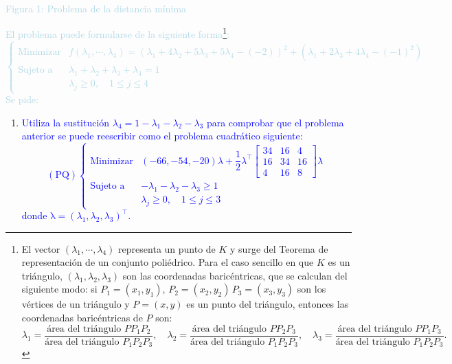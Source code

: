 \documentclass[a4paper]{article}
\newcommand{\lb}[1]{\textcolor{lightblue}{#1}}
\newcommand{\db}[1]{\textcolor{blue}{#1}}
\begin{document}
\begin{enumerate}[label=\color{red}\arabic*.]
\begin{center}
    
    \lb{Figura 1: Problema de la distancia mínima}
    \end{center}
    \lb{El problema puede formularse de la siguiente forma\footnote{El vector $(\lambda_1,\cdots,\lambda_4)$ representa un punto de $K$ y surge del Teorema de representación de un conjunto poliédrico. Para el caso sencillo en que $K$ es un triángulo, $(\lambda_1,\lambda_2,\lambda_3)$ son las coordenadas baricéntricas, que se calculan del siguiente modo: si $P_1=(x_1,y_1),\, P_2=(x_2,y_2)\, P_3=(x_3,y_3)$ son los vértices de un triángulo y $P=(x,y)$ es un punto del triángulo, entonces las coordenadas baricéntricas de $P$ son: \[ \lambda_1=\dfrac{\text{área del triángulo }PP_1P_2}{\text{área del triángulo }P_1P_2P_3},\quad\lambda_2=\dfrac{\text{área del triángulo }PP_2P_3}{\text{área del triángulo } P_1P_2P_3},\quad\lambda_3=\dfrac{\text{área del triángulo }PP_1P_3}{\text{área del triángulo }P_1P_2P_3}. \]}: \[ \begin{cases}
    \text{Minimizar} & f(\lambda_1,\cdots,\lambda_4)=(\lambda_1+4\lambda_2+5\lambda_3+5\lambda_4-(-2))^2+(\lambda_1+2\lambda_3+4\lambda_4-(-1)^2)\\
    \text{Sujeto a} & \lambda_1+\lambda_2+\lambda_3+\lambda_4=1\\
     & \lambda_j\ge0,\quad 1\le j\le 4
    \end{cases} \]Se pide:}
    \begin{enumerate}[label=\color{red}\alph*)]
    	\item \db{Utiliza la sustitución $\lambda_4=1-\lambda_1-\lambda_2-\lambda_3$ para comprobar que el problema anterior se puede reescribir como el problema cuadrático siguiente:  \begin{equation}
    	(\mathrm{PQ})\begin{cases}
    	\text{Minimizar} & (-66,-54,-20)\lambda+\dfrac{1}{2}\lambda^\intercal\begin{bmatrix}
    	34 & 16 & 4 \\
    	16 & 34 & 16 \\
    	4 & 16 & 8
    	\end{bmatrix}\lambda\\
    	\text{Sujeto a} & -\lambda_1-\lambda_2-\lambda_3\ge1\\
    	 &\lambda_j\ge0,\quad 1\le j\le 3
    	\end{cases}
    	\end{equation} donde $\mathrm{\lambda}=(\lambda_1,\lambda_2,\lambda_3)^\intercal$.}
    	

\end{enumerate}
\end{enumerate}
\end{document}
